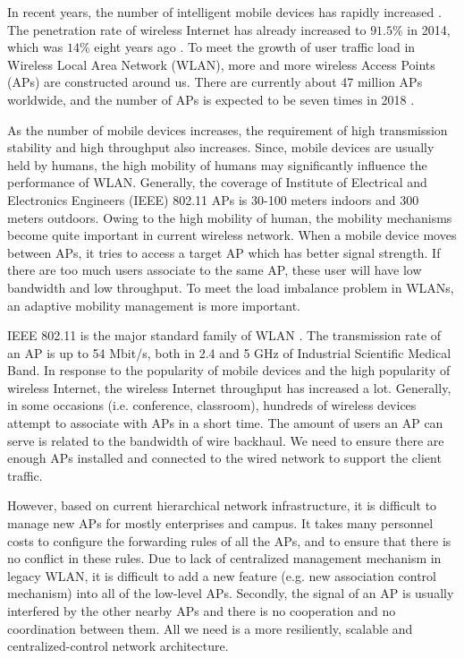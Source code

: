 In recent years, the number of intelligent mobile devices has rapidly increased \cite{tai2015comparative}. The penetration rate of wireless Internet has already increased to $91.5\%$ in 2014, which was $14\%$ eight years ago \cite{survey2014comparative}. To meet the growth of user traffic load in Wireless Local Area Network (WLAN), more and more wireless Access Points (APs) are constructed around us. There are currently about 47 million APs worldwide, and the number of APs is expected to be seven times in 2018 \cite{iPassSurvey}.

As the number of mobile devices increases, the requirement of high transmission stability and high throughput also increases. Since, mobile devices are usually held by humans, the high mobility of humans may significantly influence the performance of WLAN. Generally, the coverage of Institute of Electrical and Electronics Engineers (IEEE) 802.11 APs is 30-100 meters indoors and 300 meters outdoors. Owing to the high mobility of human, the mobility mechanisms become quite important in current wireless network. When a mobile device moves between APs, it tries to access a target AP which has better signal strength. If there are too much users associate to the same AP, these user will have low bandwidth and low throughput. To meet the load imbalance problem in WLANs, an adaptive mobility management is more important.

IEEE 802.11 is the major standard family of WLAN \cite{ieee2001ieee}. The transmission rate of an AP is up to 54 Mbit/s, both in 2.4 and 5 GHz of Industrial Scientific Medical Band. In response to the popularity of mobile devices and the high popularity of wireless Internet, the wireless Internet throughput has increased a lot. Generally, in some occasions (i.e. conference, classroom), hundreds of wireless devices attempt to associate with APs in a short time. The amount of users an AP can serve is related to the bandwidth of wire backhaul. We need to ensure there are enough APs installed and connected to the wired network to support the client traffic.

However, based on current hierarchical network infrastructure, it is difficult to manage new APs for mostly enterprises and campus. It takes many personnel costs to configure the forwarding rules of all the APs, and to ensure that there is no conflict in these rules. Due to lack of centralized management mechanism in legacy WLAN, it is difficult to add a new feature (e.g. new association control mechanism) into all of the low-level APs. Secondly, the signal of an AP is usually interfered by the other nearby APs and there is no cooperation and no coordination between them. All we need is a more resiliently, scalable and centralized-control network architecture.

